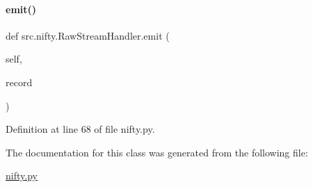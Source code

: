 \paragraph{\texorpdfstring{emit()}{emit()}}
{\footnotesize\ttfamily def src.\+nifty.\+Raw\+Stream\+Handler.\+emit (\begin{DoxyParamCaption}\item[{}]{self,  }\item[{}]{record }\end{DoxyParamCaption})}



Definition at line 68 of file nifty.\+py.



The documentation for this class was generated from the following file\+:\begin{DoxyCompactItemize}
\item 
\hyperlink{nifty_8py}{nifty.\+py}\end{DoxyCompactItemize}
